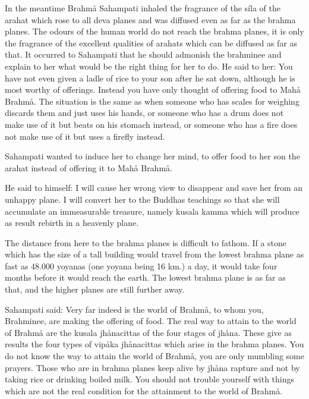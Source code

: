 \documentclass[12pt,twoside]{article}
\begin{document}
In the meantime Brahm{\aa} Sahampati inhaled the fragrance of the s\'ila
of the arahat which rose to all deva planes and was diffused even as
far as the brahma planes. The odours of the human world do not reach
the brahma planes, it is only the fragrance of the excellent qualities
of arahats which can be diffused as far as that. It occurred to
Sahampati that he should admonish the brahminee and explain to her what
would be the right thing for her to do. He said to her:
{\textasciigrave}{\textasciigrave}You have not even given a ladle of
rice to your son after he sat down, although he is most worthy of
offerings. Instead you have only thought of offering food to Mah{\aa}
Brahm{\aa}. The situation is the same as when someone who has scales
for weighing discards them and just uses his hands, or someone who has
a drum does not make use of it but beats on his stomach instead, or
someone who has a fire does not make use of it but uses a firefly
instead. {\textquotesingle}{\textquotesingle}

Sahampati wanted to induce her to change her mind, to offer food to her
son the arahat instead of offering it to Mah{\aa} Brahm{\aa}. 

He said to himself: {\textasciigrave}{\textasciigrave}I will cause her
wrong view to disappear and save her from an unhappy plane. I will
convert her to the Buddha{\textquotesingle}s teachings so that she will
accumulate an immeasurable treasure, namely kusala kamma which will
produce as result rebirth in a heavenly plane.
{\textquotesingle}{\textquotesingle}

The distance from here to the brahma planes is difficult to fathom. If a
stone which has the size of a tall building would travel from the
lowest brahma plane as fast as 48.000 yoyanas (one yoyana being 16 km.)
a day, it would take four months before it would reach the earth. The
lowest brahma plane is as far as that, and the higher planes are still
further away. 

Sahampati said: {\textasciigrave}{\textasciigrave}Very far indeed is the
world of Brahm{\aa}, to whom you, Brahminee, are making the offering of
food. The real way to attain to the world of Brahm{\aa} are the kusala
jh{\aa}nacittas of the four stages of jh{\aa}na. These give as results
the four types of vip{\aa}ka jh{\aa}nacittas which arise in the brahma
planes. You do not know the way to attain the world of Brahm{\aa}, you
are only mumbling some prayers. Those who are in brahma planes keep
alive by jh{\aa}na rapture and not by taking rice or drinking boiled
milk. You should not trouble yourself with things which are not the
real condition for the attainment to the world of
Brahm{\aa}.{\textquotesingle}{\textquotesingle}
\end{document}
